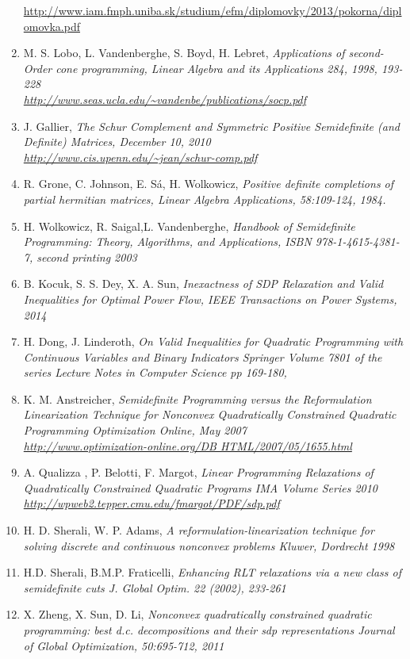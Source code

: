\documentclass[12pt]{book}
\theoremstyle{definition}
\begin{document}
\begin{enumerate}
\url{http://www.iam.fmph.uniba.sk/studium/efm/diplomovky/2013/pokorna/diplomovka.pdf}
\label{PokornaSOCPDipl}
%
\item M. S. Lobo, L. Vandenberghe, S. Boyd, H. Lebret, \it Applications of second-Order cone programming, \rm Linear Algebra and its Applications 284, 1998, 193-228\\
\url{http://www.seas.ucla.edu/~vandenbe/publications/socp.pdf}
\label{LoboVandApplicationsofSOCP}
%
\item J. Gallier, \it The Schur Complement and Symmetric Positive Semidefinite (and Definite) Matrices, \rm December 10, 2010 \\
\url{http://www.cis.upenn.edu/~jean/schur-comp.pdf}
\label{GallierSchurCompl}
%
\item R. Grone, C. Johnson, E. Sá, H. Wolkowicz, \it Positive definite completions of partial hermitian matrices, \rm 
Linear Algebra Applications, 58:109-124, 1984.
\label{GronePSDcompletions}
%
\item H. Wolkowicz, R. Saigal,L. Vandenberghe, \it Handbook of Semidefinite Programming: Theory, Algorithms, and Applications, \rm
ISBN 978-1-4615-4381-7, second printing 2003
\label{HandbookSDP}
%
\item B. Kocuk, S. S. Dey, X. A. Sun, \it Inexactness of SDP Relaxation and Valid Inequalities for Optimal Power Flow, \rm
IEEE Transactions on Power Systems, 2014
\label{InexactSDPandValidIneq}
%
\item H. Dong, J. Linderoth, \it On Valid Inequalities for Quadratic Programming with Continuous Variables and Binary Indicators \rm
Springer Volume 7801 of the series Lecture Notes in Computer Science pp 169-180,
\label{onValidIneqforQP}
%
\item K. M. Anstreicher, \it Semidefinite Programming versus the Reformulation Linearization Technique for Nonconvex Quadratically Constrained Quadratic Programming \rm Optimization Online, May 2007\\
\url{http://www.optimization-online.org/DB HTML/2007/05/1655.html}
\label{AnstreicherSDPvsRLT}
%
\item A. Qualizza , P. Belotti, F. Margot, \it Linear Programming Relaxations of Quadratically Constrained Quadratic Programs \rm 
IMA Volume Series 2010 \\
\url{http://wpweb2.tepper.cmu.edu/fmargot/PDF/sdp.pdf}
\label{MargotLPRelax}
%
\item H. D. Sherali, W. P. Adams, \it A reformulation-linearization technique for solving discrete and continuous nonconvex problems \rm
 Kluwer, Dordrecht 1998
 \label{SheraliAdamsRLT1}
%
\item H.D. Sherali, B.M.P. Fraticelli, \it Enhancing RLT relaxations via a new class of semidefinite
cuts \rm J. Global Optim. 22 (2002), 233-261
\label{SheraliEnhancingRLT}
%
\item X. Zheng, X. Sun, D. Li, \it Nonconvex quadratically constrained quadratic programming: best d.c. decompositions and their sdp representations \rm Journal of Global Optimization, 50:695-712, 2011
\label{ZhengDCdecomp}
%



\end{enumerate}
\end{document}
